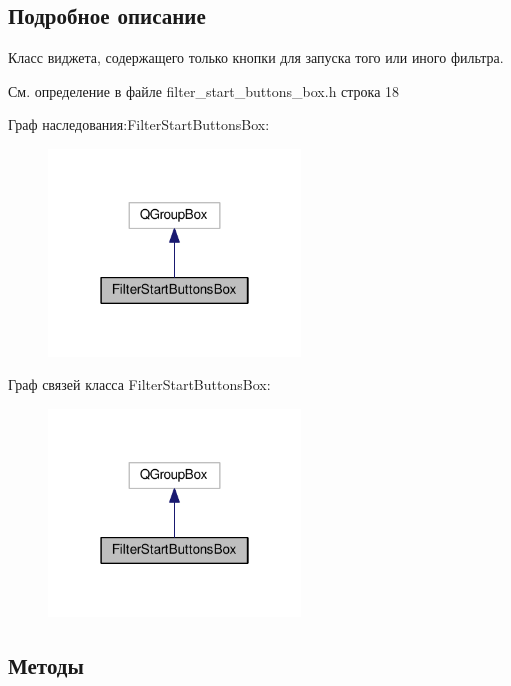 \subsection{Подробное описание}
Класс виджета, содержащего только кнопки для запуска того или иного фильтра. 

См. определение в файле filter\+\_\+start\+\_\+buttons\+\_\+box.\+h строка 18



Граф наследования\+:Filter\+Start\+Buttons\+Box\+:
\nopagebreak
\begin{figure}[H]
\begin{center}
\leavevmode
\includegraphics[width=190pt]{class_filter_start_buttons_box__inherit__graph}
\end{center}
\end{figure}


Граф связей класса Filter\+Start\+Buttons\+Box\+:
\nopagebreak
\begin{figure}[H]
\begin{center}
\leavevmode
\includegraphics[width=190pt]{class_filter_start_buttons_box__coll__graph}
\end{center}
\end{figure}


\subsection{Методы}
